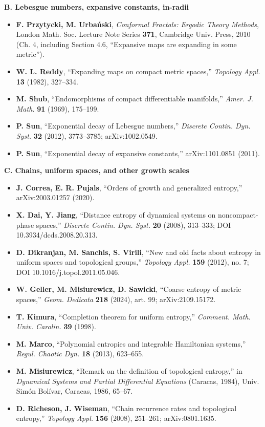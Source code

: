 \documentclass[
]{article}
\providecommand{\tightlist}{%
  \setlength{\itemsep}{0pt}\setlength{\parskip}{0pt}}
\begin{document}
\textbf{B. Lebesgue numbers, expansive constants, in-radii}

\begin{itemize}
\tightlist
\item
  \textbf{F. Przytycki, M. Urba\'{n}ski}, \emph{Conformal Fractals:
  Ergodic Theory Methods}, London Math. Soc. Lecture Note Series
  \textbf{371}, Cambridge Univ. Press, 2010 (Ch. 4, including Section 4.6,
  ``Expansive maps are expanding in some metric'').
\item
  \textbf{W. L. Reddy}, ``Expanding maps on compact metric spaces,''
  \emph{Topology Appl.} \textbf{13} (1982), 327--334.
\item
  \textbf{M. Shub}, ``Endomorphisms of compact differentiable
  manifolds,'' \emph{Amer. J. Math.} \textbf{91} (1969), 175--199.
\item
  \textbf{P. Sun}, ``Exponential decay of Lebesgue numbers,''
  \emph{Discrete Contin. Dyn. Syst.} \textbf{32} (2012), 3773--3785;
  arXiv:1002.0549.
\item
  \textbf{P. Sun}, ``Exponential decay of expansive constants,''
  arXiv:1101.0851 (2011).
\end{itemize}

\textbf{C. Chains, uniform spaces, and other growth scales}

\begin{itemize}
\tightlist
\item
  \textbf{J. Correa, E. R. Pujals}, ``Orders of growth and generalized
  entropy,'' arXiv:2003.01257 (2020).
\item
  \textbf{X. Dai, Y. Jiang}, ``Distance entropy of dynamical systems on
  noncompact-phase spaces,'' \emph{Discrete Contin. Dyn. Syst.}
  \textbf{20} (2008), 313--333; DOI 10.3934/dcds.2008.20.313.
\item
  \textbf{D. Dikranjan, M. Sanchis, S. Virili}, ``New and old facts
  about entropy in uniform spaces and topological groups,''
  \emph{Topology Appl.} \textbf{159} (2012), no. 7; DOI
  10.1016/j.topol.2011.05.046.
\item
  \textbf{W. Geller, M. Misiurewicz, D. Sawicki}, ``Coarse entropy of
  metric spaces,'' \emph{Geom. Dedicata} \textbf{218} (2024), art. 99;
  arXiv:2109.15172.
\item
  \textbf{T. Kimura}, ``Completion theorem for uniform entropy,''
  \emph{Comment. Math. Univ. Carolin.} \textbf{39} (1998).
\item
  \textbf{M. Marco}, ``Polynomial entropies and integrable Hamiltonian
  systems,'' \emph{Regul. Chaotic Dyn.} \textbf{18} (2013), 623--655.
\item
  \textbf{M. Misiurewicz}, ``Remark on the definition of topological
  entropy,'' in \emph{Dynamical Systems and Partial Differential
  Equations} (Caracas, 1984), Univ. Sim\'{o}n Bol\'{i}var, Caracas,
  1986, 65--67.
\item
  \textbf{D. Richeson, J. Wiseman}, ``Chain recurrence rates and
  topological entropy,'' \emph{Topology Appl.} \textbf{156} (2008),
  251--261; arXiv:0801.1635.
\end{itemize}
\end{document}

